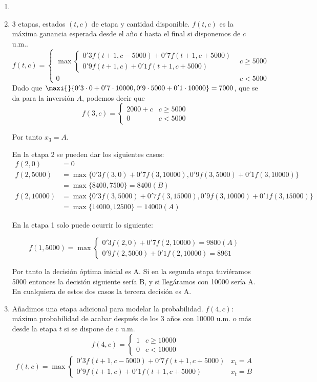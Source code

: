 \documentclass[twoside]{article}
\begin{document}
\begin{solucion}
\begin{enumerate}
\item[]
\item 3 etapas, estados $(t,c)$ de etapa y cantidad disponible. $f(t,c)$ es la máxima ganancia esperada desde el año $t$ hasta el final si disponemos de $c$ u.m..
$$f(t,c)=\begin{cases}
\max\begin{cases}
0'3f(t+1,c-5000)+0'7f(t+1,c+5000)\\
0'9f(t+1,c)+0'1f(t+1,c+5000)
\end{cases}& c\geq 5000\\
0 & c<5000
\end{cases}
$$
Dado que $\maxi{}{0'3\cdot 0+0'7\cdot 10000, 0'9\cdot 5000+0'1\cdot 10000} = 7000$, que se da para la inversión $A$, podemos decir que
$$f(3,c) = 
\begin{cases}
2000+c & c\geq 5000\\
0 & c<5000
\end{cases}
$$

Por tanto $x_3=A$. 

En la etapa 2 se pueden dar los siguientes casos:
\begin{align*}
f(2,0)&=0\\
f(2,5000)&=\max\{0'3f(3,0)+0'7f(3,10000),0'9f(3,5000)+0'1f(3,10000)\}\\
&=\max\{8400,7500\}=8400(B)\\
f(2,10000)&=\max\{0'3f(3,5000)+0'7f(3,15000),0'9f(3,10000)+0'1f(3,15000)\}\\
&=\max\{14000,12500\}=14000(A)
\end{align*}
 

En la etapa 1 solo puede ocurrir lo siguiente:

$$f(1,5000)=\max\begin{cases}
0'3f(2,0)+0'7f(2,10000)=\boxed{9800}(A)\\
0'9f(2,5000)+0'1f(2,10000)=8961
\end{cases}$$

Por tanto la decisión óptima inicial es A. Si en la segunda etapa tuviéramos 5000 entonces la decisión siguiente sería B, y si llegáramos con 10000 sería A. En cualquiera de estos dos casos la tercera decisión es A.

\item Añadimos una etapa adicional para modelar la probabilidad. $f(4,c):$ máxima probabilidad de acabar después de los 3 años con 10000 u.m. o más desde la etapa $t$ si se dispone de c u.m.  
$$f(4,c)=\begin{cases}
1 & c\geq 10000\\
0 & c<10000
\end{cases}$$
$$f(t,c)=\max\begin{cases}
0'3f(t+1,c-5000)+0'7f(t+1,c+5000) & x_t=A\\
0'9f(t+1,c)+0'1f(t+1,c+5000) & x_t=B
\end{cases}$$


\end{enumerate}
\end{solucion}
\end{document}
